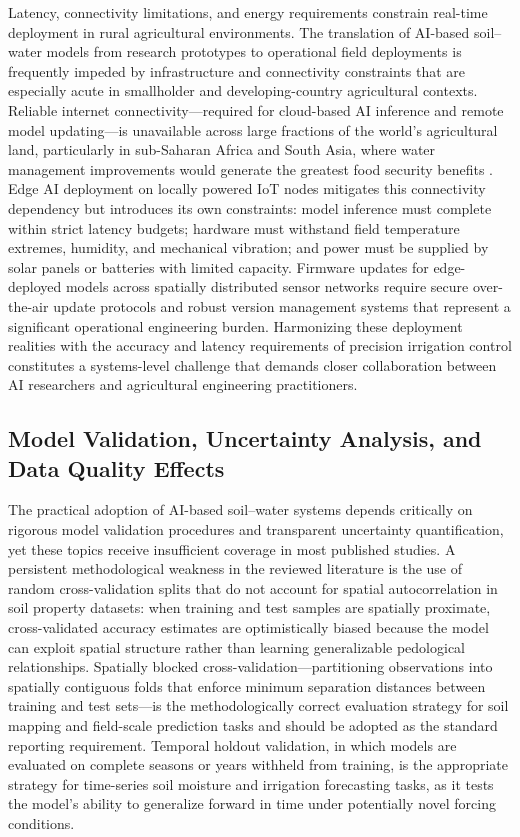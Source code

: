 \documentclass[land,review,accept,pdftex,oneauthor]{Definitions/mdpi}
\begin{document}
Latency, connectivity limitations, and energy requirements constrain real-time deployment in rural agricultural environments. The translation of AI-based soil--water models from research prototypes to operational field deployments is frequently impeded by infrastructure and connectivity constraints that are especially acute in smallholder and developing-country agricultural contexts. Reliable internet connectivity---required for cloud-based AI inference and remote model updating---is unavailable across large fractions of the world's agricultural land, particularly in sub-Saharan Africa and South Asia, where water management improvements would generate the greatest food security benefits \citep{shepherd2022ethics}. Edge AI deployment on locally powered IoT nodes mitigates this connectivity dependency but introduces its own constraints: model inference must complete within strict latency budgets; hardware must withstand field temperature extremes, humidity, and mechanical vibration; and power must be supplied by solar panels or batteries with limited capacity. Firmware updates for edge-deployed models across spatially distributed sensor networks require secure over-the-air update protocols and robust version management systems that represent a significant operational engineering burden. Harmonizing these deployment realities with the accuracy and latency requirements of precision irrigation control constitutes a systems-level challenge that demands closer collaboration between AI researchers and agricultural engineering practitioners.

\subsection{{Model Validation, Uncertainty Analysis, and Data Quality Effects}}

{The practical adoption of AI-based soil--water systems depends critically on rigorous model validation procedures and transparent uncertainty quantification, yet these topics receive insufficient coverage in most published studies. A persistent methodological weakness in the reviewed literature is the use of random cross-validation splits that do not account for spatial autocorrelation in soil property datasets: when training and test samples are spatially proximate, cross-validated accuracy estimates are optimistically biased because the model can exploit spatial structure rather than learning generalizable pedological relationships. Spatially blocked cross-validation---partitioning observations into spatially contiguous folds that enforce minimum separation distances between training and test sets---is the methodologically correct evaluation strategy for soil mapping and field-scale prediction tasks and should be adopted as the standard reporting requirement. Temporal holdout validation, in which models are evaluated on complete seasons or years withheld from training, is the appropriate strategy for time-series soil moisture and irrigation forecasting tasks, as it tests the model's ability to generalize forward in time under potentially novel forcing conditions.}
\end{document}
